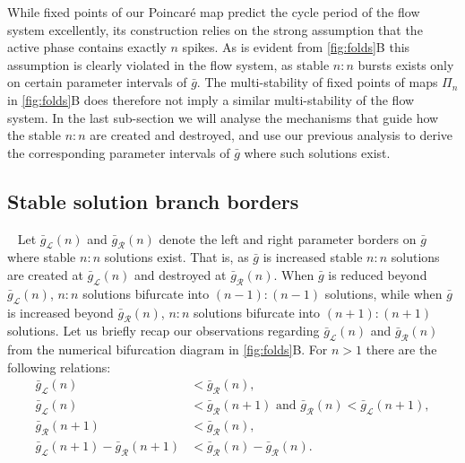 While fixed points of our Poincaré map predict the cycle period of the flow system excellently, its construction relies on the strong assumption that the active phase contains exactly $n$ spikes.
As is evident from \cref{fig:folds}B this assumption is clearly violated in the flow system, as stable $n:n$ bursts exists only on certain parameter intervals of $\bar g$.
The multi-stability of fixed points of maps $\Pi_{n}$ in \cref{fig:folds}B does therefore not imply a similar multi-stability of the flow system.
In the last sub-section we will analyse the mechanisms that guide how the stable $n:n$ are created and destroyed, and use our previous analysis to derive the corresponding parameter intervals of $\bar g$ where such solutions exist.

\subsection{Stable solution branch borders}
~\label{sec:borders}
Let $\bar g_{\mathcal{L}}(n)$ and $\bar g_{\mathcal{R}}(n)$ denote the left and right parameter borders on $\bar g$ where stable $n:n$ solutions exist.
That is, as $\bar g$ is increased stable $n:n$ solutions are created at $\bar g_{\mathcal{L}}(n)$ and destroyed at $\bar g_{\mathcal{R}}(n)$.
When $\bar g$ is reduced beyond $\bar g_{\mathcal{L}}(n)$, $n:n$ solutions bifurcate into $(n-1):(n-1)$ solutions, while when $\bar g$ is increased beyond $\bar g_{\mathcal{R}}(n)$, $n:n$ solutions bifurcate into $(n+1):(n+1)$ solutions.
Let us briefly recap our observations regarding $\bar g_{\mathcal{L}}(n)$ and $\bar g_{\mathcal{R}}(n)$ from the numerical bifurcation diagram in \cref{fig:folds}B.
For $n>1$ there are the following relations:
\begin{align}
	\bar g_{\mathcal{L}}(n)                               & < \bar g_{\mathcal{R}}(n)\label{eq:easy1},                                                                 \\
	\bar g_{\mathcal{L}}(n)                               & < \bar g_{\mathcal{R}}(n+1)\text{ and } \bar g_{\mathcal{R}}(n)<\bar g_{\mathcal{L}}(n+1)\label{eq:easy2}, \\
	\bar g_{\mathcal{R}}(n+1)                             & < \bar g_{\mathcal{R}}(n)\label{eq:coexistence},                                                           \\
	\bar g_{\mathcal{L}}(n+1) - \bar g_{\mathcal{R}}(n+1) & < \bar g_{\mathcal{R}}(n) - \bar g_{\mathcal{R}}(n)\label{eq:robustness}.
\end{align}
